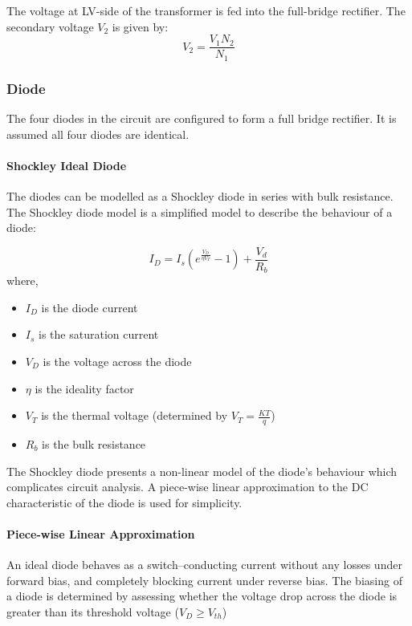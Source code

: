 The voltage at LV-side of the transformer is fed into the full-bridge rectifier. The secondary voltage $V_2$ is given by:
\begin{equation}
    V_2 = \frac{V_1N_2}{N_1}
\end{equation}

\subsubsection{Diode}
The four diodes in the circuit are configured to form a full bridge rectifier. It is assumed all four diodes are identical.

\paragraph{Shockley Ideal Diode}
The diodes can be modelled as a Shockley diode in series with bulk resistance. The Shockley diode model is a simplified model to describe the behaviour of a diode:

\begin{equation}
	I_D = I_s\left( e^{\frac{V_D}{\eta V_T}} - 1 \right) + \frac{V_d}{R_b}	\label{shockeyDiodeWithBulkResistance}
\end{equation}
where,
\begin{itemize}
	\item $I_D$ is the diode current
	\item $I_s$ is the saturation current
	\item $V_D$ is the voltage across the diode
	\item $\eta$ is the ideality factor
	\item $V_T$ is the thermal voltage (determined by $V_T = \frac{KT}{q}$)
	\item $R_b$ is the bulk resistance
\end{itemize}	

The Shockley diode presents a non-linear model of the diode's behaviour which complicates circuit analysis. A piece-wise linear approximation to the DC characteristic of the diode is used for simplicity.

\paragraph{Piece-wise Linear Approximation}
An ideal diode behaves as a switch–conducting current without any losses under forward bias, and completely blocking current under reverse bias. The biasing of a diode is determined by assessing whether the voltage drop across the diode is greater than its threshold voltage ($V_D \geq V_{th}$)

